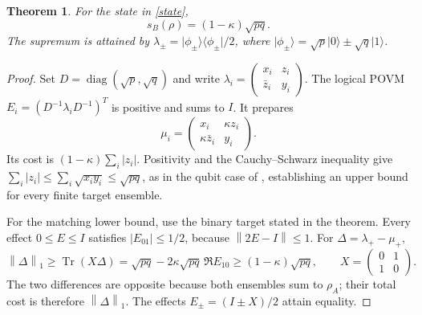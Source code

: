 \documentclass[11pt,a4paper]{article}
\newtheorem{theorem}{Theorem}
\theoremstyle{definition}
\theoremstyle{plain}
\newenvironment{statementframe}{%
  \par\addvspace{0.55\baselineskip}\noindent
  \begingroup\setlength{\fboxrule}{0.3pt}\setlength{\fboxsep}{7pt}%
  \begin{lrbox}{\statementbox}%
  \begin{minipage}{\dimexpr\linewidth-2\fboxsep-2\fboxrule\relax}%
}{%
  \end{minipage}\end{lrbox}%
  {\color{black!45}\fbox{\color{black}\usebox{\statementbox}}}%
  \endgroup\par\addvspace{0.45\baselineskip}%
}
\DeclareMathOperator{\Tr}{Tr}
\newcommand{\ket}[1]{\lvert#1\rangle}
\newcommand{\bra}[1]{\langle#1\rvert}
\newcommand{\norm}[1]{\left\lVert#1\right\rVert}
\begin{document}
\begin{statementframe}
\begin{theorem}\label{exact}
For the state in \eqref{state},
\[
\boxed{s_B(\rho)=(1-\kappa)\sqrt{pq}.}
\]
The supremum is attained by
$\lambda_\pm=\ket{\phi_\pm}\bra{\phi_\pm}/2$, where
$\ket{\phi_\pm}=\sqrt p\ket0\pm\sqrt q\ket1$.
\end{theorem}
\end{statementframe}
\begin{proof}
Set $D=\operatorname{diag}(\sqrt p,\sqrt q)$ and write
$\lambda_i=\begin{pmatrix}x_i&z_i\\\bar z_i&y_i\end{pmatrix}$.
The logical POVM $E_i=(D^{-1}\lambda_iD^{-1})^T$ is positive and sums to
$I$. It prepares
\[
\mu_i=\begin{pmatrix}x_i&\kappa z_i\\
\kappa\bar z_i&y_i\end{pmatrix}.
\]
Its cost is $(1-\kappa)\sum_i|z_i|$. Positivity and the Cauchy--Schwarz
inequality give
$\sum_i|z_i|\leq\sum_i\sqrt{x_i y_i}\leq\sqrt{pq}$, as in the qubit case of
\cite[Theorem~1]{Zhao}, establishing an upper bound for every finite target
ensemble.

For the matching lower bound, use the binary target stated in the theorem.
Every effect $0\leq E\leq I$ satisfies $|E_{01}|\leq1/2$, because
$\norm{2E-I}\leq1$. For $\Delta=\lambda_+-\mu_+$,
\[
\norm\Delta_1\geq\Tr(X\Delta)
=\sqrt{pq}-2\kappa\sqrt{pq}\,\Re E_{10}
\geq(1-\kappa)\sqrt{pq},
\qquad X=\begin{pmatrix}0&1\\1&0\end{pmatrix}.
\]
The two differences are opposite because both ensembles sum to $\rho_A$;
their total cost is therefore $\norm\Delta_1$. The effects
$E_\pm=(I\pm X)/2$ attain equality.
\end{proof}
\end{document}
